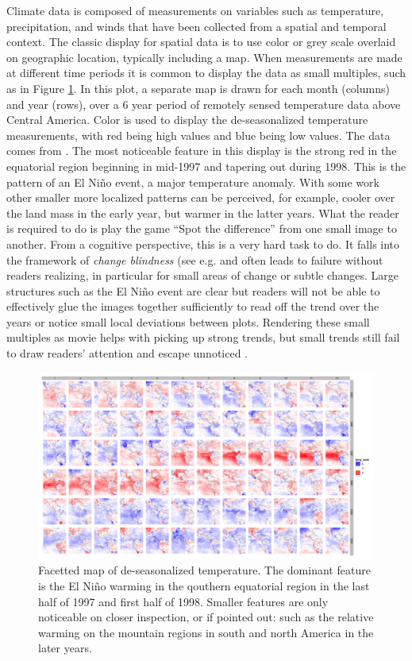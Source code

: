 \documentclass[oneside]{article}
\begin{document}
Climate data is composed of measurements on variables such as temperature, precipitation, and winds that have been collected from a spatial and temporal context. The classic display for spatial data is to use color or grey scale overlaid on geographic location, typically including a map. When measurements are made at different time periods it is common to display the data as small multiples, such as in Figure \ref{fig:facetted-map}. In this plot, a separate map is drawn for each month (columns) and year (rows), over a 6 year period of remotely sensed temperature data above Central America. Color is used to display the de-seasonalized temperature measurements, with red being high values and blue being low values. The data comes from \citet{murrell:2010}. The most noticeable feature in this display is the strong red in the equatorial region beginning in mid-1997 and tapering out during 1998. This is the pattern of an El Ni\~no event, a major temperature anomaly. With some work other smaller more localized patterns can be perceived, for example, cooler over the land mass in the early year, but warmer in the latter years. What the reader is required to do is play the game ``Spot the difference'' from one small image to another. From a cognitive perspective, this is a very hard task to do. It falls into the framework of {\it change blindness} (see e.g. \citet{healey:2011} and often leads to failure without readers realizing, in particular for small areas of change or subtle changes.  Large structures such as the El Ni\~no event are clear but readers will not be able to effectively glue the images together sufficiently to read off the trend over the years or notice small local deviations between plots. Rendering these small multiples as movie helps with picking up strong trends, but small trends still fail to draw readers' attention and escape unnoticed \citep{simons:gradual}.

\begin{figure}[htp]
\centerline{\includegraphics[width=6in]{nasa-colored-map.png}}
\caption{Facetted map of de-seasonalized temperature. The dominant feature is the El Ni\~no warming in the qouthern equatorial region in the last half of 1997 and first half of 1998. Smaller features are only noticeable on closer inspection, or if pointed out: such as the relative warming on the mountain regions in south and north America in the later years.}
\label{fig:facetted-map}
\end{figure}
\end{document}
